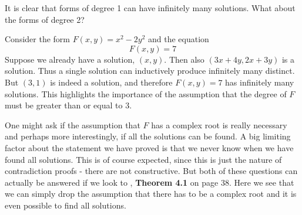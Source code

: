 \documentclass{article}
\begin{document}
It is clear that forms of degree 1 can have infinitely many solutions. What about the forms of degree 2?

Consider the form $F(x,y) = x^2 - 2y^2$ and the equation 
$$F(x, y) = 7$$
Suppose we already have a solution, $(x,y)$. Then also $(3x + 4y, 2x + 3y)$ is a solution. Thus a single solution can inductively produce infinitely many distinct. But $(3,1)$ is indeed a solution, and therefore $F(x, y) = 7$ has infinitely many solutions. This highlights the importance of the assumption that the degree of $F$ must be greater than or equal to 3.   


One might ask if the assumption that $F$ has a complex root is really necessary and perhaps more interestingly, if all the solutions can be found. A big limiting factor about the statement we have proved is that we never know when we have found all solutions. This is of course expected, since this is just the nature of contradiction proofs - there are not constructive. But both of these questions can actually be answered if we look to \cite{baker}, \textbf{Theorem 4.1} on page 38. Here we see that we can simply drop the assumption that there has to be a complex root and it is even possible to find all solutions.


\end{document}
